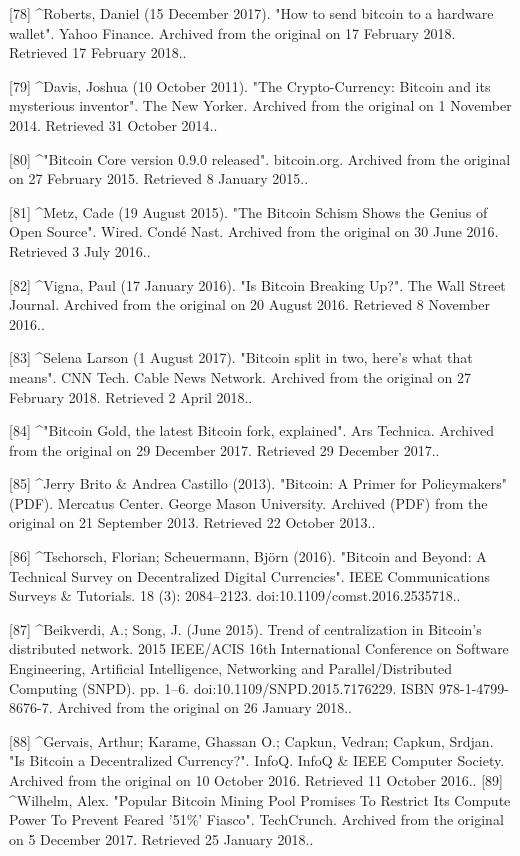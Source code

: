 [78]
^Roberts, Daniel (15 December 2017). "How to send bitcoin to a hardware wallet". Yahoo Finance. Archived from the original on 17 February 2018. Retrieved 17 February 2018..

[79]
^Davis, Joshua (10 October 2011). "The Crypto-Currency: Bitcoin and its mysterious inventor". The New Yorker. Archived from the original on 1 November 2014. Retrieved 31 October 2014..

[80]
^"Bitcoin Core version 0.9.0 released". bitcoin.org. Archived from the original on 27 February 2015. Retrieved 8 January 2015..

[81]
^Metz, Cade (19 August 2015). "The Bitcoin Schism Shows the Genius of Open Source". Wired. Condé Nast. Archived from the original on 30 June 2016. Retrieved 3 July 2016..

[82]
^Vigna, Paul (17 January 2016). "Is Bitcoin Breaking Up?". The Wall Street Journal. Archived from the original on 20 August 2016. Retrieved 8 November 2016..

[83]
^Selena Larson (1 August 2017). "Bitcoin split in two, here's what that means". CNN Tech. Cable News Network. Archived from the original on 27 February 2018. Retrieved 2 April 2018..

[84]
^"Bitcoin Gold, the latest Bitcoin fork, explained". Ars Technica. Archived from the original on 29 December 2017. Retrieved 29 December 2017..

[85]
^Jerry Brito & Andrea Castillo (2013). "Bitcoin: A Primer for Policymakers" (PDF). Mercatus Center. George Mason University. Archived (PDF) from the original on 21 September 2013. Retrieved 22 October 2013..

[86]
^Tschorsch, Florian; Scheuermann, Björn (2016). "Bitcoin and Beyond: A Technical Survey on Decentralized Digital Currencies". IEEE Communications Surveys & Tutorials. 18 (3): 2084–2123. doi:10.1109/comst.2016.2535718..

[87]
^Beikverdi, A.; Song, J. (June 2015). Trend of centralization in Bitcoin's distributed network. 2015 IEEE/ACIS 16th International Conference on Software Engineering, Artificial Intelligence, Networking and Parallel/Distributed Computing (SNPD). pp. 1–6. doi:10.1109/SNPD.2015.7176229. ISBN 978-1-4799-8676-7. Archived from the original on 26 January 2018..

[88]
^Gervais, Arthur; Karame, Ghassan O.; Capkun, Vedran; Capkun, Srdjan. "Is Bitcoin a Decentralized Currency?". InfoQ. InfoQ & IEEE Computer Society. Archived from the original on 10 October 2016. Retrieved 11 October 2016..
[89]
^Wilhelm, Alex. "Popular Bitcoin Mining Pool Promises To Restrict Its Compute Power To Prevent Feared '51\%' Fiasco". TechCrunch. Archived from the original on 5 December 2017. Retrieved 25 January 2018..

